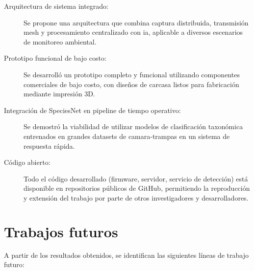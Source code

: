 \documentclass[a4paper, 12pt]{report}
\begin{document}
\begin{description}
  \item[Arquitectura de sistema integrado:] Se propone una arquitectura
    que combina captura distribuida, transmisión mesh y procesamiento
    centralizado con \gls{ia}, aplicable a diversos escenarios de
    monitoreo ambiental.

  \item[Prototipo funcional de bajo costo:] Se desarrolló un prototipo
    completo y funcional utilizando componentes comerciales de bajo
    costo, con diseños de carcasa listos para fabricación mediante
    impresión 3D.

  \item[Integración de SpeciesNet en pipeline de tiempo operativo:] Se
    demostró la viabilidad de utilizar modelos de clasificación
    taxonómica entrenados en grandes datasets de \glspl{camara-trampa}
    en un sistema de respuesta rápida.

  \item[Código abierto:] Todo el código desarrollado (firmware, servidor,
    servicio de detección) está disponible en repositorios públicos de
    GitHub, permitiendo la reproducción y extensión del trabajo por
    parte de otros investigadores y desarrolladores.
\end{description}

\section{Trabajos futuros}

A partir de los resultados obtenidos, se identifican las siguientes
líneas de trabajo futuro:
\end{document}
